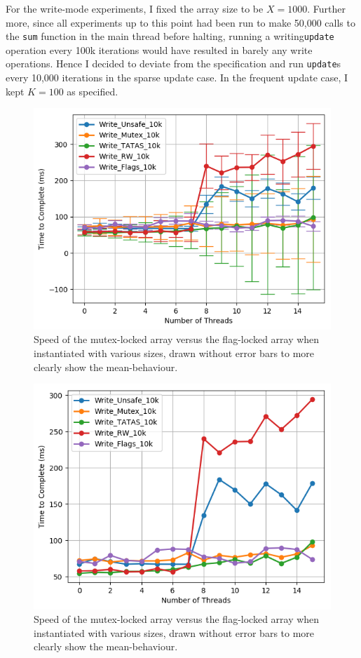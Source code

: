 \documentclass[11pt]{article}
\begin{document}
For the write-mode experiments, I fixed the array size to be $X = 1000$. Further more, since all experiments up to this point had been run to make 50,000 calls to the \texttt{sum} function in the main thread before halting, running a writing\texttt{update} operation every 100k iterations would have resulted in barely any write operations. Hence I decided to deviate from the specification and run \texttt{update}s every 10,000 iterations in the sparse update case.
In the frequent update case, I kept $K=100$ as specified.
\begin{figure}\label{fig:step7_1}
\centering
\includegraphics[scale=0.65]{step7_1.png}
\caption{Speed of the mutex-locked array versus the flag-locked array when instantiated with various sizes, drawn without error bars to more clearly show the mean-behaviour.}
\end{figure}

\begin{figure}\label{fig:step7_2}
\centering
\includegraphics[scale=0.65]{step7_2.png}
\caption{Speed of the mutex-locked array versus the flag-locked array when instantiated with various sizes, drawn without error bars to more clearly show the mean-behaviour.}
\end{figure}
\end{document}
